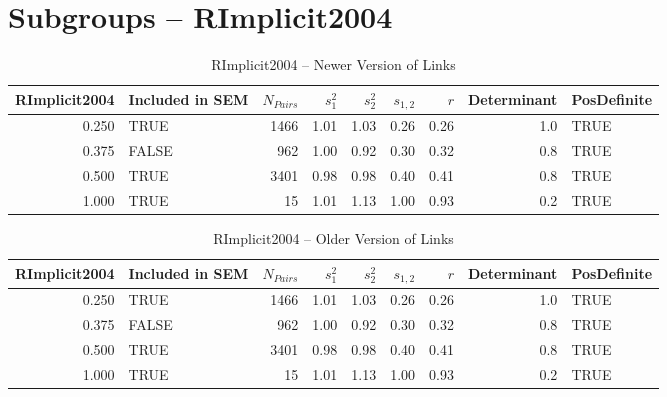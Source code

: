 \documentclass{article}\usepackage{graphicx, color}
\begin{document}
\section{Subgroups --  RImplicit2004 }%
\begin{table}[ht]
\begin{center}
\begin{tabular}{rlrrrrrrl}
  \hline
RImplicit2004 & Included in SEM & $N_{Pairs}$ & $s_1^2$ & $s_2^2$ & $s_{1,2}$ & $r$ & Determinant & PosDefinite \\ 
  \hline
0.250 & TRUE & 1466 & 1.01 & 1.03 & 0.26 & 0.26 & 1.0 & TRUE \\ 
  0.375 & FALSE & 962 & 1.00 & 0.92 & 0.30 & 0.32 & 0.8 & TRUE \\ 
  0.500 & TRUE & 3401 & 0.98 & 0.98 & 0.40 & 0.41 & 0.8 & TRUE \\ 
  1.000 & TRUE & 15 & 1.01 & 1.13 & 1.00 & 0.93 & 0.2 & TRUE \\ 
   \hline
\end{tabular}
\caption{RImplicit2004 -- Newer Version of Links}
\end{center}
\end{table}
\begin{table}[ht]
\begin{center}
\begin{tabular}{rlrrrrrrl}
  \hline
RImplicit2004 & Included in SEM & $N_{Pairs}$ & $s_1^2$ & $s_2^2$ & $s_{1,2}$ & $r$ & Determinant & PosDefinite \\ 
  \hline
0.250 & TRUE & 1466 & 1.01 & 1.03 & 0.26 & 0.26 & 1.0 & TRUE \\ 
  0.375 & FALSE & 962 & 1.00 & 0.92 & 0.30 & 0.32 & 0.8 & TRUE \\ 
  0.500 & TRUE & 3401 & 0.98 & 0.98 & 0.40 & 0.41 & 0.8 & TRUE \\ 
  1.000 & TRUE & 15 & 1.01 & 1.13 & 1.00 & 0.93 & 0.2 & TRUE \\ 
   \hline
\end{tabular}
\caption{RImplicit2004 -- Older Version of Links}
\end{center}
\end{table}



\end{document}

